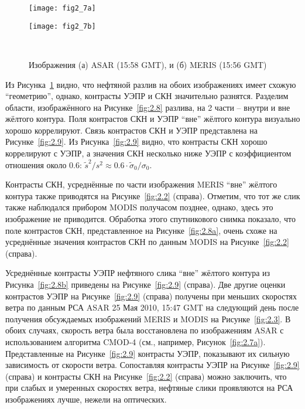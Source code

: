 \begin{figure}[H]
   	\centering
	\begin{minipage}{.49\textwidth}
	    \subcaptionbox{\label{fig:2.7a}}
		{\texttt{[image: fig2\_7a]}}
	\end{minipage}
	\hfill
	\begin{minipage}{.49\textwidth}
	    \subcaptionbox{\label{fig:2.7b}}
		{\texttt{[image: fig2\_7b]}}
	\end{minipage}
    \\
    \caption{Изображения (а) ASAR (15:58 GMT), и (б) MERIS (15:56 GMT)}
    \label{fig:2.7}
\end{figure}


Из Рисунка~\ref{fig:2.7} видно, что нефтяной разлив на обоих изображениях имеет схожую ``геометрию'', однако, контрасты УЭПР и СКН значительно разнятся. Разделим области, изображённого на Рисунке~\ref{fig:2.8} разлива, на 2 части -- внутри и вне жёлтого контура. Поля контрастов СКН и УЭПР ``вне'' жёлтого контура визуально хорошо коррелируют. Связь контрастов СКН и УЭПР представлена на Рисунке~\ref{fig:2.9}. Из Рисунка~\ref{fig:2.9} видно, что контрасты СКН хорошо коррелируют с УЭПР, а значения СКН несколько ниже УЭПР с коэффициентом отношения около 0.6: $\tilde{s}^{2} /s^{2} \approx 0.6\cdot \tilde{\sigma }_{0} /\sigma _{0}$.

Контрасты СКН, усреднённые по части изображения MERIS ``вне'' жёлтого контура также приводятся на Рисунке~\ref{fig:2.2} (справа). Отметим, что тот же слик также наблюдался прибором MODIS получасом позднее, однако, здесь это изображение не приводится. Обработка этого спутникового снимка показало, что поле контрастов СКН, представленное на Рисунке~\ref{fig:2.8a}, очень схоже на усреднённые значения контрастов СКН по данным MODIS на Рисунке~\ref{fig:2.2} (справа).

Усреднённые контрасты УЭПР нефтяного слика ``вне'' жёлтого контура из Рисунка~\ref{fig:2.8b} приведены на Рисунке~\ref{fig:2.9} (справа). Две другие оценки контрастов УЭПР на Рисунке~\ref{fig:2.9} (справа) получены при меньших скоростях ветра по данным РСА ASAR 25 Мая 2010, 15:47 GMT на следующий день после получения обсуждаемых изображений MERIS и MODIS на Рисунке~\ref{fig:2.3}. В обоих случаях, скорость ветра была восстановлена по изображениям ASAR с использованием алгоритма CMOD-4 (см., например, Рисунок~\ref{fig:2.7a}). Представленные на Рисунке~\ref{fig:2.9} контрасты УЭПР, показывают их сильную зависимость от скорости ветра. Сопоставляя контрасты УЭПР на Рисунке~\ref{fig:2.9} (справа) и контрасты СКН на Рисунке~\ref{fig:2.2} (справа) можно заключить, что при слабых и умеренных скоростях ветра, нефтяные слики проявляются на РСА изображениях лучше, нежели на оптических.



